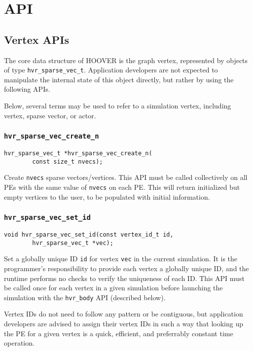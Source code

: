\section{API}

\subsection{Vertex APIs}

The core data structure of HOOVER is the graph vertex, represented by objects of
type \texttt{hvr\_sparse\_vec\_t}. Application developers are not expected to
manipulate the internal state of this object directly, but rather by using the
following APIs.

Below, several terms may be used to refer to a simulation vertex, including
vertex, sparse vector, or actor.

\subsubsection{\texttt{hvr\_sparse\_vec\_create\_n}}

\begin{verbatim}
hvr_sparse_vec_t *hvr_sparse_vec_create_n(
        const size_t nvecs);
\end{verbatim}

Create \texttt{nvecs} sparse vectors/vertices. This API must be called
collectively on all PEs with the same value of \texttt{nvecs} on each PE. This
will return initialized but empty vertices to the user, to be populated with
initial information.

\subsubsection{\texttt{hvr\_sparse\_vec\_set\_id}}

\begin{verbatim}
void hvr_sparse_vec_set_id(const vertex_id_t id,
        hvr_sparse_vec_t *vec);
\end{verbatim}

Set a globally unique ID \texttt{id} for vertex \texttt{vec} in the current
simulation. It is the programmer's responsibility to provide each vertex a
globally unique ID, and the runtime performs no checks to verify the uniqueness
of each ID. This API must be called once for each vertex in a given simulation
before launching the simulation with the \texttt{hvr\_body} API (described
below).

Vertex IDs do not need to follow any pattern or be contiguous, but application
developers are advised to assign their vertex IDs in such a way that looking up
the PE for a given vertex is a quick, efficient, and preferrably constant time
operation.


